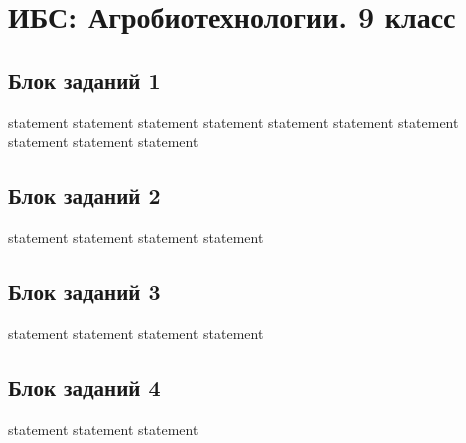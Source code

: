 \chapter{ИБС: Агробиотехнологии. 9 класс}

\section{Блок заданий 1}

{statement}
{statement}
{statement}
{statement}
{statement}
{statement}
{statement}
{statement}
{statement}
{statement}

\section{Блок заданий 2}

{statement}
{statement}
{statement}
{statement}

\section{Блок заданий 3}

{statement}
{statement}
{statement}
{statement}

\section{Блок заданий 4}

{statement}
{statement}
{statement}